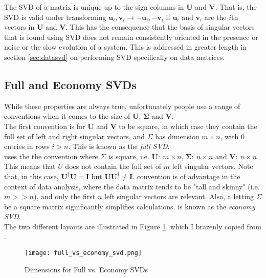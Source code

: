The SVD of a matrix is unique up to the sign columns in $\mathbf{U}$ and $\mathbf{V}$. That is, the SVD is valid under transforming $\mathbf{u}_i, \mathbf{v}_i \rightarrow -\mathbf{u}_i, -\mathbf{v}_i $ if $\mathbf{u}_i$ and $ \mathbf{v}_i$ are the $i$th vectors in $\mathbf{U}$ and $\mathbf{V}$. This has the consequence that the basis of singular vectors that is found using SVD does not remain consistently oriented in the presence or noise or the slow evolution of a system. This is addressed in greater length in section \ref{sec:datasvd} on performing SVD specifically on data matrices.

\subsection{Full and Economy SVDs}
While these properties are always true, unfortunately people use a range of conventions when it comes to the size of $\mathbf{U}$, $\mathbf{\Sigma}$ and $\mathbf{V}$. \\

The first convention is for $\mathbf{U}$ and $\mathbf{V}$ to be square, in which case they contain the full set of left and right singular vectors, and $\Sigma$ has dimension $m\times n$, with $0$ entries in rows $i>n$. This is known as the \textit{full SVD}.\\

 uses the the convention where $\Sigma$ is square, i.e. $\mathbf{U}:\ m\times n$, $\mathbf{\Sigma}:\ n\times n$ and $\mathbf{V}:\ n\times n$. This means that $U$ does not contain the full set of $m$ left singular vectors. Note that, in this case, $\mathbf{U^{\dagger}}\mathbf{U} = \mathbf{I}$ but $\mathbf{U}\mathbf{U^{\dagger}} \neq \mathbf{I}$.  convention is of advantage in the context of data analysis, where the data matrix tends to be "tall and skinny" (i.e. $m>>n$), and only the first $n$ left singular vectors are relevant. Also, a letting $\Sigma$ be a square matrix significantly simplifies calculations.  is known as the \textit{economy SVD}.\\

The two different layouts are illustrated in Figure \ref{fig:full_vs_economy_svd}, which I brazenly copied from .

\begin{figure}
\centering
\texttt{[image: full\_vs\_economy\_svd.png]}
\caption{Dimensions for Full vs. Economy SVDs}
\label{fig:full_vs_economy_svd}
\end{figure}

